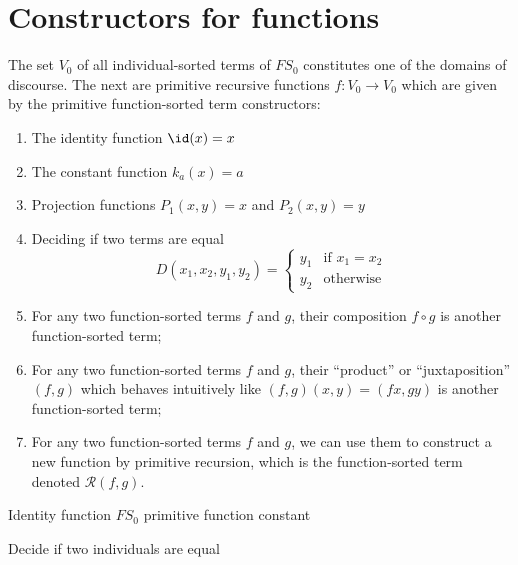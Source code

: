 \section*{Constructors for functions}

\begin{node}
The set $V_{0}$ of all individual-sorted terms of $FS_{0}$ constitutes
one of the domains of discourse. The next are primitive recursive functions $f\colon V_{0}\to V_{0}$
which are given by the primitive function-sorted term constructors:
\begin{enumerate}
\item The identity function $\id(x)=x$
\item The constant function $k_{a}(x)=a$
\item Projection functions $P_{1}(x,y)=x$ and $P_{2}(x,y)=y$
\item Deciding if two terms are equal
  \begin{equation*}
D(x_{1},x_{2},y_{1},y_{2})=\begin{cases}y_{1} & \mbox{if }x_{1}=x_{2}\\
y_{2} & \mbox{otherwise}
\end{cases}
\end{equation*}
\item For any two function-sorted terms $f$ and $g$, their composition
  $f\circ g$ is another function-sorted term;
\item For any two function-sorted terms $f$ and $g$, their ``product''
  or ``juxtaposition'' $(f,g)$ which behaves intuitively like
  $(f,g)(x,y)=(fx,gy)$ is another function-sorted term;
\item For any two function-sorted terms $f$ and $g$, we can use them
  to construct a new function by primitive recursion, which is the
  function-sorted term denoted $\mathcal{R}(f,g)$.
\end{enumerate}
\end{node}

\nwenddocs{}\endmoddef\nwstartdeflinemarkup{}\nwenddeflinemarkup
\LA{}Identity function $FS_{0}$ primitive function constant~{\nwtagstyle{}}\RA{}

\LA{}Decide if two individuals are equal~{\nwtagstyle{}}\RA{}

